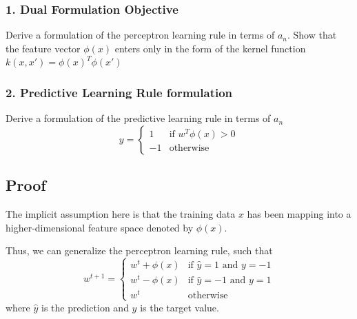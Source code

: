 \documentclass[parskip=full]{scrartcl}
\begin{document}
        \subsubsection*{1. Dual Formulation Objective} %
        \label{ssub:dual_formulation_objective}

            Derive a formulation of the perceptron learning rule in terms of $a_n$. Show that the feature vector $\phi(x)$ enters only in the form of the kernel function $k(x, x\prime) = \phi(x)^T\phi(x\prime)$
        

        \subsubsection*{2. Predictive Learning Rule formulation} %
        \label{ssub:predictive_learning_rule_formulation}
        
            Derive a formulation of the predictive learning rule in terms of $a_n$
            \begin{equation*}
                y = 
                \begin{cases}
                    1 & \text{if } w^T \phi(x) > 0 \\
                    -1 & \text{otherwise}
                \end{cases}
            \end{equation*}




    \subsection*{Proof} %
    \label{sub:proof_2}

        The implicit assumption here is that the training data $x$ has been mapping into a higher-dimensional feature space denoted by $\phi(x)$.

        Thus, we can generalize the perceptron learning rule, such that
        \begin{equation*}
            w^{t+1} = 
            \begin{cases}
                w^t + \phi(x) & \text{if } \hat{y} = 1 \text{ and } y = -1 \\
                w^t - \phi(x) & \text{if } \hat{y} = -1 \text{ and } y = 1 \\
                w^t & \text{otherwise}
            \end{cases}
        \end{equation*}
        where $\hat{y}$ is the prediction and $y$ is the target value.
\end{document}
